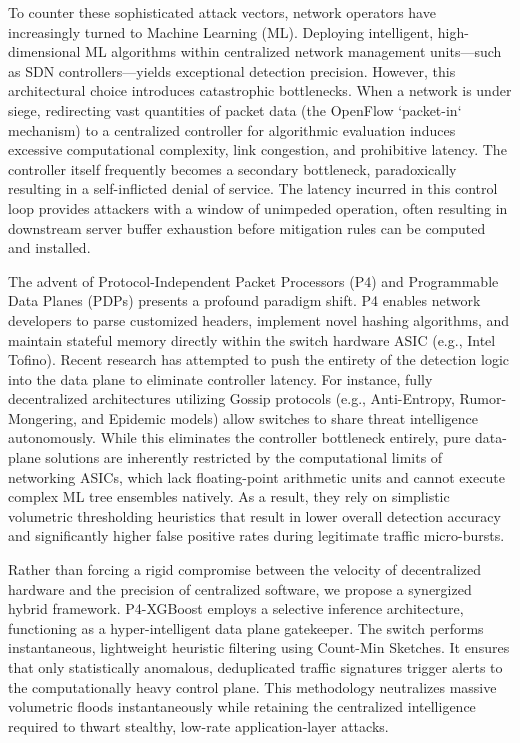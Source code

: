 \documentclass[sigconf, nonacm]{acmart}
\begin{document}
To counter these sophisticated attack vectors, network operators have increasingly turned to Machine Learning (ML). Deploying intelligent, high-dimensional ML algorithms within centralized network management units—such as SDN controllers—yields exceptional detection precision. However, this architectural choice introduces catastrophic bottlenecks. When a network is under siege, redirecting vast quantities of packet data (the OpenFlow `packet-in` mechanism) to a centralized controller for algorithmic evaluation induces excessive computational complexity, link congestion, and prohibitive latency. The controller itself frequently becomes a secondary bottleneck, paradoxically resulting in a self-inflicted denial of service. The latency incurred in this control loop provides attackers with a window of unimpeded operation, often resulting in downstream server buffer exhaustion before mitigation rules can be computed and installed.

The advent of Protocol-Independent Packet Processors (P4) and Programmable Data Planes (PDPs) presents a profound paradigm shift. P4 enables network developers to parse customized headers, implement novel hashing algorithms, and maintain stateful memory directly within the switch hardware ASIC (e.g., Intel Tofino). Recent research has attempted to push the entirety of the detection logic into the data plane to eliminate controller latency. For instance, fully decentralized architectures utilizing Gossip protocols \cite{smriti2026, smriti2023} (e.g., Anti-Entropy, Rumor-Mongering, and Epidemic models) allow switches to share threat intelligence autonomously. While this eliminates the controller bottleneck entirely, pure data-plane solutions are inherently restricted by the computational limits of networking ASICs, which lack floating-point arithmetic units and cannot execute complex ML tree ensembles natively. As a result, they rely on simplistic volumetric thresholding heuristics that result in lower overall detection accuracy and significantly higher false positive rates during legitimate traffic micro-bursts.

Rather than forcing a rigid compromise between the velocity of decentralized hardware and the precision of centralized software, we propose a synergized hybrid framework. P4-XGBoost employs a selective inference architecture, functioning as a hyper-intelligent data plane gatekeeper. The switch performs instantaneous, lightweight heuristic filtering using Count-Min Sketches. It ensures that only statistically anomalous, deduplicated traffic signatures trigger alerts to the computationally heavy control plane. This methodology neutralizes massive volumetric floods instantaneously while retaining the centralized intelligence required to thwart stealthy, low-rate application-layer attacks.
\end{document}
